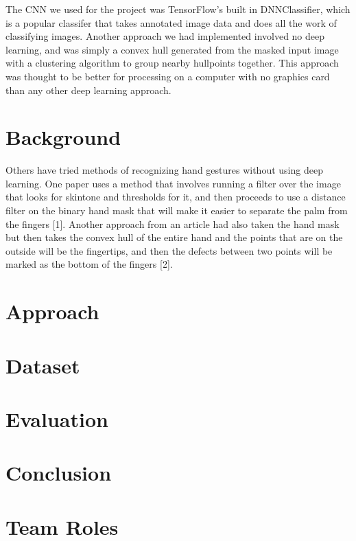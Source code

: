 \documentclass[twocolumn]{article}
\begin{document}
The CNN we used for the project was TensorFlow's built in DNNClassifier, which is a popular classifer that takes annotated image data and does all the work of classifying images. Another approach we had implemented involved no deep learning, and was simply a convex hull generated from the masked input image with a clustering algorithm to group nearby hullpoints together. This approach was thought to be better for processing on a computer with no graphics card than any other deep learning approach.\\

\section{Background}
Others have tried methods of recognizing hand gestures without using deep learning. One paper uses a method that involves running a filter over the image that looks for skintone and thresholds for it, and then proceeds to use a distance filter on the binary hand mask that will make it easier to separate the palm from the fingers [1]. Another approach from an article had also taken the hand mask but then takes the convex hull of the entire hand and the points that are on the outside will be the fingertips, and then the defects between two points will be marked as the bottom of the fingers [2].

\section{Approach}

\section{Dataset}

\section{Evaluation}

\section{Conclusion}


\section{Team Roles}
\end{document}
